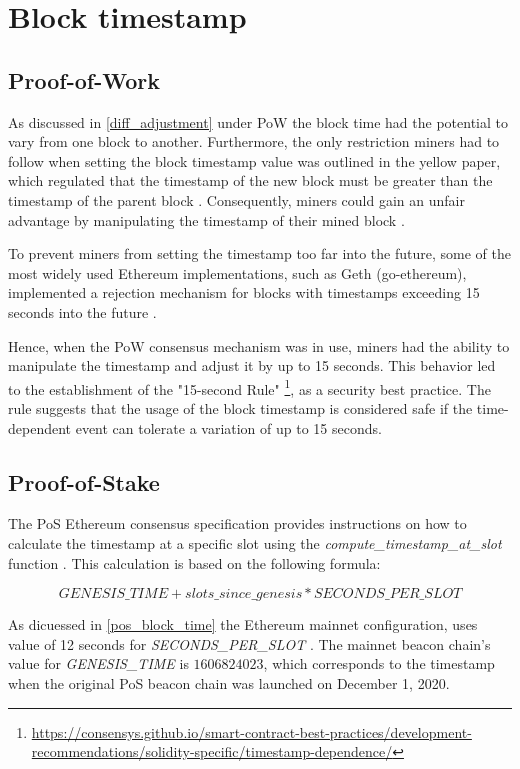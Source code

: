\section{Block timestamp}
\subsection{Proof-of-Work}
As discussed in \ref{diff_adjustment} under PoW the block time had the
potential to vary from one block to another. Furthermore, the only restriction
miners had to follow when setting the block timestamp value was outlined in the
yellow paper, which regulated that the timestamp of the new block must be
greater than the timestamp of the parent block \cite{ethyellowpaper2023}.
Consequently, miners could gain an unfair advantage by manipulating the
timestamp of their mined block \cite{swc116}.

To prevent miners from setting the timestamp too far into the future, some of
the most widely used Ethereum implementations, such as Geth (go-ethereum),
implemented a rejection mechanism for blocks with timestamps exceeding 15
seconds into the future \cite{go-ethereum-15-sek-limit}.

Hence, when the PoW consensus mechanism was in use, miners had the ability to
manipulate the timestamp and adjust it by up to 15 seconds. This behavior led
to the establishment of the "15-second Rule"
\footnote{\url{https://consensys.github.io/smart-contract-best-practices/development-recommendations/solidity-specific/timestamp-dependence/}},
as a security best practice. The
rule suggests that the usage of the block timestamp is considered
safe if the time-dependent event can tolerate a variation of up to 15 seconds.

\subsection{Proof-of-Stake}
  
The PoS Ethereum consensus specification provides instructions on how to
calculate the timestamp at a specific slot using the
\textit{compute\_timestamp\_at\_slot} function \cite{compute-timestamp-at-slot}.
This calculation is based on the following formula:

\begin{equation}
GENESIS\_TIME + slots\_since\_genesis *
SECONDS\_PER\_SLOT
\end{equation}


As dicuessed in \ref{pos_block_time} the Ethereum mainnet configuration, uses
value of 12 seconds for \textit{SECONDS\_PER\_SLOT}
\cite{seconds-per-slot-mainnet} \cite{seconds-per-slot-mainnet-doc}.
The mainnet beacon chain's value for \textit{GENESIS\_TIME} is $1606824023$, which
corresponds to the timestamp when the original PoS beacon chain was launched on
December 1, 2020.

